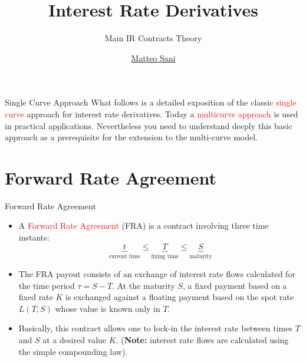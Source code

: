 \documentclass{beamer}
\title{Interest Rate Derivatives}
\subtitle{Main IR Contracts Theory}
\author{\href{mailto:matteo.sani@unisi.it}{Matteo Sani}}
\begin{document}
\begin{frame}[plain]
  \maketitle
\end{frame}

\begin{frame}{Single Curve Approach}
  What follows is a detailed exposition of the classic \textcolor{red}{single curve}
  approach for interest rate derivatives. Today a \textcolor{red}{multicurve approach} is
  used in practical applications. Nevertheless you need to understand
  deeply this basic approach as a prerequisite for the extension to the
  multi-curve model.
\end{frame}          

\section{Forward Rate Agreement}
\begin{frame}{Forward Rate Agreement}
	\begin{itemize}	
		\item<1-> A \textcolor{red}{Forward Rate Agreement} (FRA) is a contract involving three time instants: %
		\begin{equation*}
			\underbrace{t}_{\text{current time}} \leq \underbrace{T}_{\text{fixing time}} \leq\underbrace{S}_{\text{maturity}}
		\end{equation*}
		\item<2-> The FRA payout consists of an exchange of interest rate flows calculated for the time period $\tau=S-T$. At the maturity $S$, a fixed payment based on a fixed rate $K$ is exchanged against a floating payment based on the spot rate $L(T, S)$ whose value is known only in $T$.
		\item<3-> Basically, this contract allows one to lock-in the interest rate between times $T$ and $S$ at a desired value $K$. (\textbf{Note:} interest rate flows are calculated using the simple compounding law).
	\end{itemize}
\end{frame}
\end{document}
